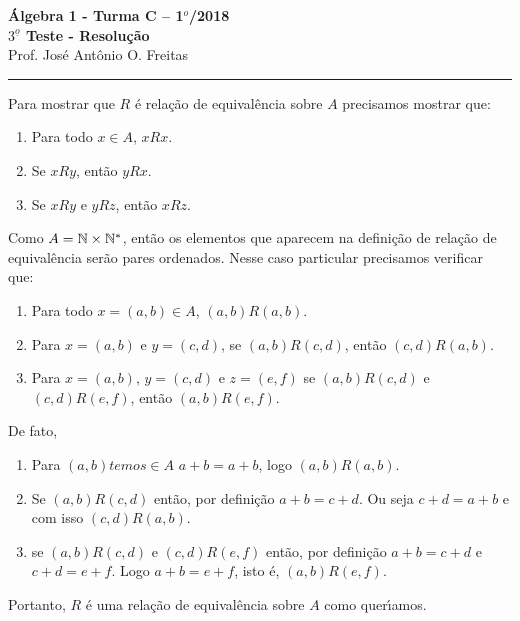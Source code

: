 \documentclass[12pt]{article}
\begin{document}


\begin{center}
{\Large\bf {\'A}lgebra 1 - Turma C -- 1$^{o}$/2018} \\ \vspace{9pt} {\large\bf
  $3^{\underline{o}}$ Teste - Resolu\c{c}\~ao}\\
\vspace{9pt} Prof. Jos{\'e} Ant{\^o}nio O. Freitas
\end{center}
\hrule

\vspace{.6cm}

\questao Para mostrar que $R$ \'e rela\c{c}\~ao de equival\^encia sobre $A$ precisamos mostrar que:
\begin{enumerate}[label={\roman*})]
	\item Para todo $x \in A$, $xRx$.
	\item Se $xRy$, ent\~ao $yRx$.
	\item Se $xRy$ e $yRz$, ent\~ao $xRz$.
\end{enumerate}

Como $A = \mathbb{N} \times \mathbb{N}^*$, ent\~ao os elementos que aparecem na defini\c{c}\~ao de rela\c{c}\~ao de equival\^encia ser\~ao pares ordenados. Nesse caso particular precisamos verificar que:
\begin{enumerate}[label={\roman*})]
	\item Para todo $x = (a,b) \in A$, $(a,b)R(a,b)$.
	\item Para $x = (a,b)$ e $y = (c,d)$, se $(a,b)R(c,d)$, ent\~ao $(c,d)R(a,b)$.
	\item Para $x = (a,b)$, $y = (c,d)$ e $z = (e,f)$ se $(a,b)R(c,d)$ e $(c,d)R(e,f)$, ent\~ao $(a,b)R(e,f)$.
\end{enumerate}

De fato,
\begin{enumerate}[label={\roman*})]
	\item Para $(a,b) temos \in A$ $a + b = a + b$, logo $(a,b)R(a,b)$.
	\item Se $(a,b)R(c,d)$ ent\~ao, por defini\c{c}\~ao $a + b = c + d$. Ou seja $c + d = a + b$ e com isso $(c,d)R(a,b)$.
	\item se $(a,b)R(c,d)$ e $(c,d)R(e,f)$ ent\~ao, por defini\c{c}\~ao $a + b = c + d$  e $c + d = e + f$. Logo $a + b = e + f$, isto \'e, $(a,b)R(e,f)$.
\end{enumerate}

Portanto, $R$ \'e uma rela\c{c}\~ao de equival\^encia sobre $A$ como quer{\'\i}amos.
\end{document}
